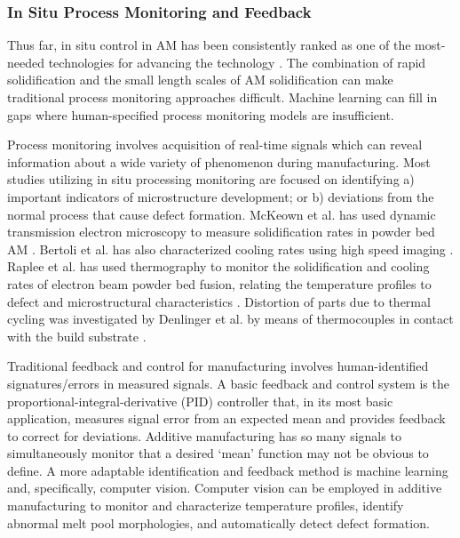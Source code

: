 \subsubsection{In Situ Process Monitoring and Feedback}

Thus far, in situ control in AM has been consistently ranked as one of the most-needed technologies for advancing the technology \cite{Berumen2010, Tapia2014, Mani2017}. The combination of rapid solidification and the small length scales of AM solidification can make traditional process monitoring approaches difficult. Machine learning can fill in gaps where human-specified process monitoring models are insufficient.

Process monitoring involves acquisition of real-time signals which can reveal information about a wide variety of phenomenon during manufacturing. Most studies utilizing in situ processing monitoring are focused on identifying a) important indicators of microstructure development; or b) deviations from the normal process that cause defect formation. McKeown et al. has used dynamic transmission electron microscopy to measure solidification rates in powder bed AM \cite{McKeown2016}. Bertoli et al. has also characterized cooling rates using high speed imaging \cite{Bertoli2017}. Raplee et al. has used thermography to monitor the solidification and cooling rates of electron beam powder bed fusion, relating the temperature profiles to defect and microstructural characteristics \cite{Raplee2017}. Distortion of parts due to thermal cycling was investigated by Denlinger et al. by means of thermocouples in contact with the build substrate \cite{Denlinger2015}. 

Traditional feedback and control for manufacturing involves human-identified signatures/errors in measured signals. A basic feedback and control system is the proportional-integral-derivative (PID) controller that, in its most basic application, measures signal error from an expected mean and provides feedback to correct for deviations. Additive manufacturing has so many signals to simultaneously monitor that a desired `mean' function may not be obvious to define. A more adaptable identification and feedback method is machine learning and, specifically, computer vision. Computer vision can be employed in additive manufacturing to monitor and characterize temperature profiles, identify abnormal melt pool morphologies, and automatically detect defect formation. 

